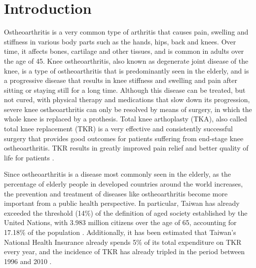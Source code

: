 \documentclass[../main.tex]{subfiles}
\begin{document}
	
\chapter{Introduction}
 
 Ostheoarthritis is a very common type of arthritis that causes pain, swelling and stiffness in various body parts such as the hands, hips, back and knees. Over time, it affects bones, cartilage and other tissues, and is common in adults over the age of 45. Knee ostheoarthritis, also known as degenerate joint disease of the knee, is a type of ostheoarthritis that is predominantly seen in the elderly, and is a progressive disease that results in knee stiffness and swelling and pain after sitting or staying still for a long time. Although this disease can be treated, but not cured, with physical therapy and medications that slow down its progression, severe knee ostheoarthritis can only be resolved by means of surgery, in which the whole knee is replaced by a prothesis. Total knee arthoplasty (TKA), also called total knee replacement (TKR) is a very effective and consistently successful surgery that provides good outcomes for patients suffering from end-stage knee ostheoarthritis. TKR results in greatly improved pain relief and better quality of life for patients \cite{varacalloTotalKneeArthroplasty2025}.
 
Since ostheoarthritis is a disease most commonly seen in the elderly, as the percentage of elderly people in developed countries around the world increases, the prevention and treatment of diseases like ostheoarthritis become more important from a public health perspective. In particular, Taiwan has already  exceeded the threshold (14\%) of the definition of aged society established by the United Nations, with 3.983 million citizens over the age of 65, accounting for 17.18\% of the population \cite{ElderlyDisadvantagedSituation2024}. Additionally, it has been estimated that Taiwan's National Health Insurance already spends 5\% of its total expenditure on TKR every year, and the incidence of TKR has already tripled in the period between 1996 and 2010 \cite{linIncreaseTotalKnee2018}.
 
\end{document}
